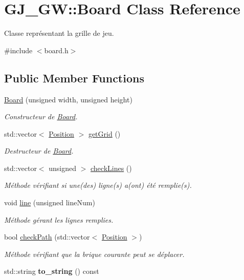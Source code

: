 \hypertarget{class_g_j___g_w_1_1_board}{}\section{G\+J\+\_\+\+GW\+:\+:Board Class Reference}
\label{class_g_j___g_w_1_1_board}


Classe représentant la grille de jeu.  




{\ttfamily \#include $<$board.\+h$>$}

\subsection*{Public Member Functions}
\begin{DoxyCompactItemize}
\item 
\hyperlink{class_g_j___g_w_1_1_board_a8029a10441779488fdace01047b27dcd}{Board} (unsigned width, unsigned height)
\begin{DoxyCompactList}\small\item\em Constructeur de \hyperlink{class_g_j___g_w_1_1_board}{Board}. \end{DoxyCompactList}\item 
std\+::vector$<$ \hyperlink{class_g_j___g_w_1_1_position}{Position} $>$ \hyperlink{class_g_j___g_w_1_1_board_a3360e1825ba9b116fbbca29db0b1464c}{get\+Grid} ()
\begin{DoxyCompactList}\small\item\em Destructeur de \hyperlink{class_g_j___g_w_1_1_board}{Board}. \end{DoxyCompactList}\item 
std\+::vector$<$ unsigned $>$ \hyperlink{class_g_j___g_w_1_1_board_aa613553d159cdf49805a7f083381f038}{check\+Lines} ()
\begin{DoxyCompactList}\small\item\em Méthode vérifiant si une(des) ligne(s) a(ont) été remplie(s). \end{DoxyCompactList}\item 
void \hyperlink{class_g_j___g_w_1_1_board_a54c122c1ebdd27a5f9375a673f436dab}{line} (unsigned line\+Num)
\begin{DoxyCompactList}\small\item\em Méthode gérant les lignes remplies. \end{DoxyCompactList}\item 
bool \hyperlink{class_g_j___g_w_1_1_board_ab8cf3ac1607e01c772e0637b7fa34da7}{check\+Path} (std\+::vector$<$ \hyperlink{class_g_j___g_w_1_1_position}{Position} $>$)
\begin{DoxyCompactList}\small\item\em Méthode vérifiant que la brique courante peut se déplacer. \end{DoxyCompactList}\item 
\hypertarget{class_g_j___g_w_1_1_board_a64b185f47e828c590621289c6ac5a407}{}\label{class_g_j___g_w_1_1_board_a64b185f47e828c590621289c6ac5a407} 
std\+::string {\bfseries to\+\_\+string} () const
\end{DoxyCompactItemize}
